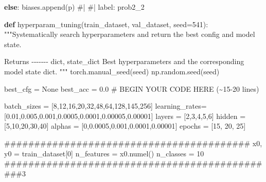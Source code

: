 \documentclass[
  letterpaper,
  DIV=11,
  numbers=noendperiod]{scrartcl}
\newenvironment{Shaded}{\begin{snugshade}}{\end{snugshade}}
\newcommand{\CommentTok}[1]{\textcolor[rgb]{0.37,0.37,0.37}{#1}}
\newcommand{\ControlFlowTok}[1]{\textcolor[rgb]{0.00,0.23,0.31}{\textbf{#1}}}
\newcommand{\DecValTok}[1]{\textcolor[rgb]{0.68,0.00,0.00}{#1}}
\newcommand{\FloatTok}[1]{\textcolor[rgb]{0.68,0.00,0.00}{#1}}
\newcommand{\KeywordTok}[1]{\textcolor[rgb]{0.00,0.23,0.31}{\textbf{#1}}}
\newcommand{\NormalTok}[1]{\textcolor[rgb]{0.00,0.23,0.31}{#1}}
\newcommand{\OperatorTok}[1]{\textcolor[rgb]{0.37,0.37,0.37}{#1}}
\newcommand{\RegionMarkerTok}[1]{\textcolor[rgb]{0.00,0.23,0.31}{#1}}
\newcommand{\VariableTok}[1]{\textcolor[rgb]{0.07,0.07,0.07}{#1}}
\begin{document}
\begin{Shaded}
\begin{Highlighting}[]
\ControlFlowTok{else}\NormalTok{:}
\NormalTok{        biases.append(p)}
\CommentTok{\#| \#| label: prob2\_2}

\KeywordTok{def}\NormalTok{ hyperparam\_tuning(train\_dataset, val\_dataset, seed}\OperatorTok{=}\DecValTok{541}\NormalTok{):}
    \CommentTok{"""Systematically search hyperparameters and return the best config and model state.}

\CommentTok{    Returns}
\CommentTok{    {-}{-}{-}{-}{-}{-}{-}}
\CommentTok{    dict, state\_dict}
\CommentTok{        Best hyperparameters and the corresponding model state dict.}
\CommentTok{    """}
\NormalTok{    torch.manual\_seed(seed)}
\NormalTok{    np.random.seed(seed)}

\NormalTok{    best\_cfg }\OperatorTok{=} \VariableTok{None}
\NormalTok{    best\_acc }\OperatorTok{=} \FloatTok{0.0}
    \CommentTok{\# }\RegionMarkerTok{BEGIN}\CommentTok{ YOUR CODE HERE (\textasciitilde{}15{-}20 lines)}


\NormalTok{    batch\_sizes }\OperatorTok{=}\NormalTok{ [}\DecValTok{8}\NormalTok{,}\DecValTok{12}\NormalTok{,}\DecValTok{16}\NormalTok{,}\DecValTok{20}\NormalTok{,}\DecValTok{32}\NormalTok{,}\DecValTok{48}\NormalTok{,}\DecValTok{64}\NormalTok{,}\DecValTok{128}\NormalTok{,}\DecValTok{145}\NormalTok{,}\DecValTok{256}\NormalTok{]}
\NormalTok{    learning\_rates}\OperatorTok{=}\NormalTok{ [}\FloatTok{0.01}\NormalTok{,}\FloatTok{0.005}\NormalTok{,}\FloatTok{0.001}\NormalTok{,}\FloatTok{0.0005}\NormalTok{,}\FloatTok{0.0001}\NormalTok{,}\FloatTok{0.00005}\NormalTok{,}\FloatTok{0.00001}\NormalTok{]}
\NormalTok{    layers }\OperatorTok{=}\NormalTok{ [}\DecValTok{2}\NormalTok{,}\DecValTok{3}\NormalTok{,}\DecValTok{4}\NormalTok{,}\DecValTok{5}\NormalTok{,}\DecValTok{6}\NormalTok{]}
\NormalTok{    hidden }\OperatorTok{=}\NormalTok{ [}\DecValTok{5}\NormalTok{,}\DecValTok{10}\NormalTok{,}\DecValTok{20}\NormalTok{,}\DecValTok{30}\NormalTok{,}\DecValTok{40}\NormalTok{]}
\NormalTok{    alphas }\OperatorTok{=}\NormalTok{ [}\DecValTok{0}\NormalTok{,}\FloatTok{0.0005}\NormalTok{,}\FloatTok{0.001}\NormalTok{,}\FloatTok{0.0001}\NormalTok{,}\FloatTok{0.00001}\NormalTok{]}
\NormalTok{    epochs }\OperatorTok{=}\NormalTok{ [}\DecValTok{15}\NormalTok{, }\DecValTok{20}\NormalTok{, }\DecValTok{25}\NormalTok{]}


    \CommentTok{\#\#\#\#\#\#\#\#\#\#\#\#\#\#\#\#\#\#\#\#\#\#\#\#\#\#\#\#\#\#\#\#\#\#\#\#\#\#\#\#\#}
\NormalTok{    x0, y0 }\OperatorTok{=}\NormalTok{ train\_dataset[}\DecValTok{0}\NormalTok{]}
\NormalTok{    n\_features }\OperatorTok{=}\NormalTok{ x0.numel()}
\NormalTok{    n\_classes  }\OperatorTok{=} \DecValTok{10}
    \CommentTok{\#\#\#\#\#\#\#\#\#\#\#\#\#\#\#\#\#\#\#\#\#\#\#\#\#\#\#\#\#\#\#\#\#\#\#\#\#\#\#\#\#\#\#\#\#\#3}



\end{Highlighting}
\end{Shaded}
\end{document}
